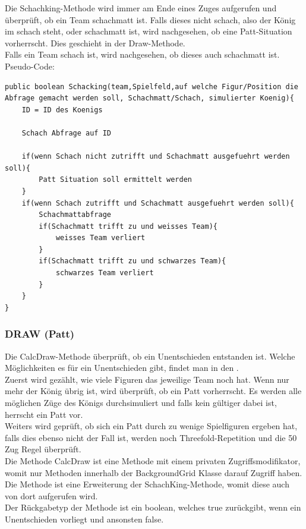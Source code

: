 \documentclass[12pt,a4paper]{article}
\begin{document}
Die Schachking-Methode wird immer am Ende eines Zuges aufgerufen und überprüft, ob ein Team schachmatt ist. Falls dieses nicht schach, also der König im schach steht, oder schachmatt ist, wird nachgesehen, ob eine Patt-Situation vorherrscht. Dies geschieht in der Draw-Methode. \\
Falls ein Team schach ist, wird nachgesehen, ob dieses auch schachmatt ist. \\
Pseudo-Code:

\lstset{language=Java}
\begin{lstlisting}
public boolean Schacking(team,Spielfeld,auf welche Figur/Position die Abfrage gemacht werden soll, Schachmatt/Schach, simulierter Koenig){
	ID = ID des Koenigs
	
	Schach Abfrage auf ID
	
	if(wenn Schach nicht zutrifft und Schachmatt ausgefuehrt werden soll){
		Patt Situation soll ermittelt werden
	}
	if(wenn Schach zutrifft und Schachmatt ausgefuehrt werden soll){
		Schachmattabfrage
		if(Schachmatt trifft zu und weisses Team){
			weisses Team verliert
		}	
		if(Schachmatt trifft zu und schwarzes Team){
			schwarzes Team verliert
		}
	}
}
\end{lstlisting}

\subsubsection{DRAW (Patt)}
\label{SUBSUBSEC:draw}

Die CalcDraw-Methode überprüft, ob ein Unentschieden entstanden ist. Welche Möglichkeiten es für ein Unentschieden gibt, findet man in den . \\
Zuerst wird gezählt, wie viele Figuren das jeweilige Team noch hat. Wenn nur mehr der König übrig ist, wird überprüft, ob ein Patt vorherrscht. Es werden alle möglichen Züge des Königs durchsimuliert und falls kein gültiger dabei ist, herrscht ein Patt vor. \\
Weiters wird geprüft, ob sich ein Patt durch zu wenige Spielfiguren ergeben hat, falls dies ebenso nicht der Fall ist, werden noch Threefold-Repetition und die 50 Zug Regel überprüft. \\[2ex]
Die Methode CalcDraw ist eine Methode mit einem privaten Zugriffsmodifikator, womit nur Methoden innerhalb der BackgroundGrid Klasse darauf Zugriff haben. Die Methode ist eine Erweiterung der SchachKing-Methode, womit diese auch von dort aufgerufen wird. \\
Der Rückgabetyp der Methode ist ein boolean, welches true zurückgibt, wenn ein Unentschieden vorliegt und ansonsten false.
\end{document}
